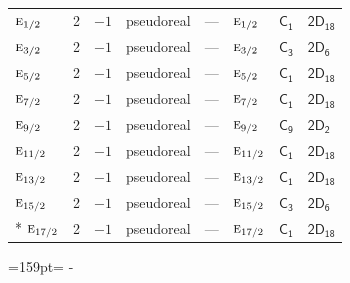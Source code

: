 \documentclass[10pt,a4paper]{article}
\makeatletter
\def\grouprule#1#2{\noalign{\marks\LTgroupmarks{\the\belowrulesep}\nobreak\vskip#1%
  \vskip\aboverulesep}\multispan\LT@cols\unskip{\leaders\hrule\@height#2\hfill\kern\z@}\cr
  \noalign{\penalty\LTrulebreak\vskip\belowrulesep\global\@lastruleclass\z@}}
\newcommand{\needspace}[1]{\par\penalty-100\begingroup\dimen0=#1\relax\dimen2=\pagegoal
  \advance\dimen2-\pagetotal\ifdim\dimen0>\dimen2\relax\ifdim\dimen2>0pt\vfil\break\fi\fi
  \endgroup}
\numberwithin{equation}{section}
\newcommand{\grp}[1]{\mathsf{#1}}
\newcommand{\irr}[1]{\text{\normalfont\scshape #1}}
\makeatother
\begin{document}
{\begin{longtable}{@{}lrrlllll@{}}
\grouprule{0pt}{\lightrulewidth}
$\irr{e}_{1/2}$ & 2 & $-1$ & pseudoreal & --- & $\irr{e}_{1/2}$ & \href{C1.pdf}{$\grp{C_{1}}$} & $\grp{2D_{18}}$\\
$\irr{e}_{3/2}$ & 2 & $-1$ & pseudoreal & --- & $\irr{e}_{3/2}$ & \href{C3.pdf}{$\grp{C_{3}}$} & \href{2D6.pdf}{$\grp{2D_{6}}$}\\
$\irr{e}_{5/2}$ & 2 & $-1$ & pseudoreal & --- & $\irr{e}_{5/2}$ & \href{C1.pdf}{$\grp{C_{1}}$} & $\grp{2D_{18}}$\\
$\irr{e}_{7/2}$ & 2 & $-1$ & pseudoreal & --- & $\irr{e}_{7/2}$ & \href{C1.pdf}{$\grp{C_{1}}$} & $\grp{2D_{18}}$\\
$\irr{e}_{9/2}$ & 2 & $-1$ & pseudoreal & --- & $\irr{e}_{9/2}$ & \href{C9.pdf}{$\grp{C_{9}}$} & \href{2D2.pdf}{$\grp{2D_{2}}$}\\
$\irr{e}_{11/2}$ & 2 & $-1$ & pseudoreal & --- & $\irr{e}_{11/2}$ & \href{C1.pdf}{$\grp{C_{1}}$} & $\grp{2D_{18}}$\\
$\irr{e}_{13/2}$ & 2 & $-1$ & pseudoreal & --- & $\irr{e}_{13/2}$ & \href{C1.pdf}{$\grp{C_{1}}$} & $\grp{2D_{18}}$\\
$\irr{e}_{15/2}$ & 2 & $-1$ & pseudoreal & --- & $\irr{e}_{15/2}$ & \href{C3.pdf}{$\grp{C_{3}}$} & \href{2D6.pdf}{$\grp{2D_{6}}$}\\*
$\irr{e}_{17/2}$ & 2 & $-1$ & pseudoreal & --- & $\irr{e}_{17/2}$ & \href{C1.pdf}{$\grp{C_{1}}$} & $\grp{2D_{18}}$\\
\bottomrule\end{longtable}}
\needspace{159pt}
\end{document}
